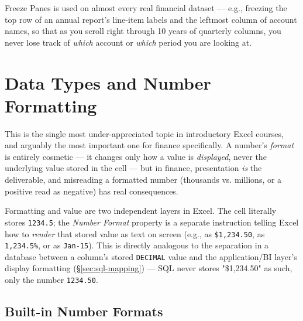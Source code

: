 \documentclass[11pt,a4paper]{article}
\begin{document}
\begin{financeapp}
Freeze Panes is used on almost every real financial dataset --- e.g., freezing the top row of an annual report's line-item labels and the leftmost column of account names, so that as you scroll right through 10 years of quarterly columns, you never lose track of \emph{which} account or \emph{which} period you are looking at.
\end{financeapp}

\section{Data Types and Number Formatting}
\label{sec:numformat}

This is the single most under-appreciated topic in introductory Excel courses, and arguably the most important one for finance specifically. A number's \emph{format} is entirely cosmetic --- it changes only how a value is \emph{displayed}, never the underlying value stored in the cell --- but in finance, presentation \emph{is} the deliverable, and misreading a formatted number (thousands vs. millions, or a positive read as negative) has real consequences.

\begin{keyconcept}
Formatting and value are two independent layers in Excel. The cell literally stores \texttt{1234.5}; the \emph{Number Format} property is a separate instruction telling Excel how to \emph{render} that stored value as text on screen (e.g., as \texttt{\$1,234.50}, as \texttt{1,234.5\%}, or as \texttt{Jan-15}). This is directly analogous to the separation in a database between a column's stored \texttt{DECIMAL} value and the application/BI layer's display formatting (\S\ref{sec:sql-mapping}) --- SQL never stores "\$1,234.50" as such, only the number \texttt{1234.50}.
\end{keyconcept}

\subsection{Built-in Number Formats}
\end{document}
